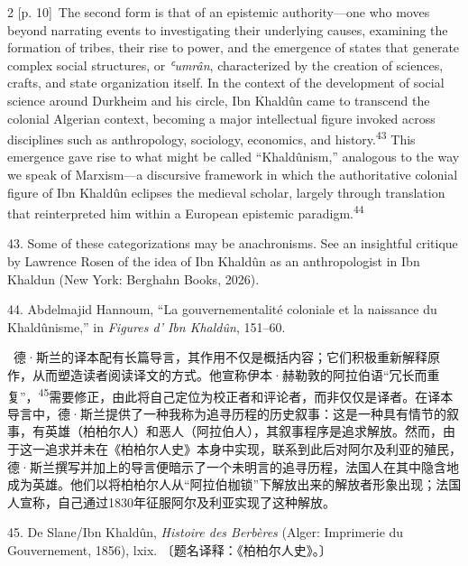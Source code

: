 \documentclass[10pt,a4paper]{article}
\begin{document}
\begin{paracol}{2}
{\scriptsize\color{gray} [p. 10]}\ The second form is that of an epistemic authority—one who moves beyond narrating events to investigating their underlying causes, examining the formation of tribes, their rise to power, and the emergence of states that generate complex social structures, or \textit{ʿumrân}, characterized by the creation of sciences, crafts, and state organization itself. In the context of the development of social science around Durkheim and his circle, Ibn Khaldûn came to transcend the colonial Algerian context, becoming a major intellectual figure invoked across disciplines such as anthropology, sociology, economics, and history.\nobreak\textsuperscript{43} This emergence gave rise to what might be called “Khaldûnism,” analogous to the way we speak of Marxism—a discursive framework in which the authoritative colonial figure of Ibn Khaldûn eclipses the medieval scholar, largely through translation that reinterpreted him within a European epistemic paradigm.\nobreak\textsuperscript{44}\par{\small 43. Some of these categorizations may be anachronisms. See an insightful critique by Lawrence Rosen of the idea of Ibn Khaldûn as an anthropologist in Ibn Khaldun (New York: Berghahn Books, 2026).\par}{\small 44. Abdelmajid Hannoum, “La gouvernementalité coloniale et la naissance du Khaldûnisme,” in \textit{Figures d’ Ibn Khaldûn}, 151–60.\par}
\switchcolumn*
{\scriptsize\color{gray} [p. 11]}\ 德·斯兰的译本配有长篇导言，其作用不仅是概括内容；它们积极重新解释原作，从而塑造读者阅读译文的方式。他宣称伊本·赫勒敦的阿拉伯语“冗长而重复”，\nobreak\textsuperscript{45}需要修正，由此将自己定位为校正者和评论者，而非仅仅是译者。在译本导言中，德·斯兰提供了一种我称为追寻历程的历史叙事：这是一种具有情节的叙事，有英雄（柏柏尔人）和恶人（阿拉伯人），其叙事程序是追求解放。然而，由于这一追求并未在《柏柏尔人史》本身中实现，联系到此后对阿尔及利亚的殖民，德·斯兰撰写并加上的导言便暗示了一个未明言的追寻历程，法国人在其中隐含地成为英雄。他们以将柏柏尔人从“阿拉伯枷锁”下解放出来的解放者形象出现；法国人宣称，自己通过1830年征服阿尔及利亚实现了这种解放。\par{\small 45. De Slane/Ibn Khaldûn, \textit{Histoire des Berbères} (Alger: Imprimerie du Gouvernement, 1856), lxix. 〔题名译释：《柏柏尔人史》。〕\par}
\switchcolumn

\end{paracol}
\end{document}
